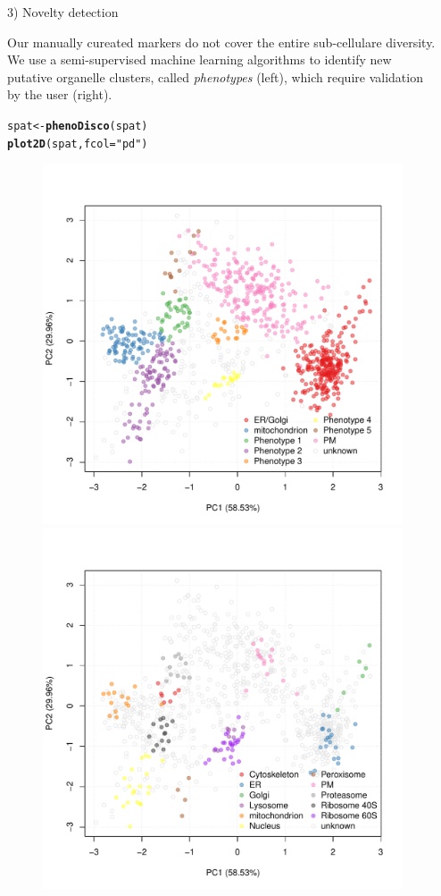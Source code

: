 \documentclass[final]{beamer}\usepackage[]{graphicx}\usepackage[]{color}
\makeatletter
\newcommand{\hlstr}[1]{\textcolor[rgb]{0.192,0.494,0.8}{#1}}%
\newcommand{\hlstd}[1]{\textcolor[rgb]{0.345,0.345,0.345}{#1}}%
\newcommand{\hlkwb}[1]{\textcolor[rgb]{0.69,0.353,0.396}{#1}}%
\newcommand{\hlkwc}[1]{\textcolor[rgb]{0.333,0.667,0.333}{#1}}%
\newcommand{\hlkwd}[1]{\textcolor[rgb]{0.737,0.353,0.396}{\textbf{#1}}}%
\newenvironment{kframe}{%
 \def\at@end@of@kframe{}%
 \ifinner\ifhmode%
  \def\at@end@of@kframe{\end{minipage}}%
  \begin{minipage}{\columnwidth}%
 \fi\fi%
 \def\FrameCommand##1{\hskip\@totalleftmargin \hskip-\fboxsep
 \colorbox{shadecolor}{##1}\hskip-\fboxsep
     \hskip-\linewidth \hskip-\@totalleftmargin \hskip\columnwidth}%
 \MakeFramed {\advance\hsize-\width
   \@totalleftmargin\z@ \linewidth\hsize
   \@setminipage}}%
 {\par\unskip\endMakeFramed%
 \at@end@of@kframe}
\newenvironment{knitrout}{}{} %
\makeatother
\begin{document}
\begin{frame}[fragile]
\begin{columns}
\begin{column}{.48\textwidth}
    \end{column}



    \begin{column}{.48\textwidth}  

      \begin{block}{3) Novelty detection}
        
        Our manually cureated markers do not cover the entire
        sub-cellulare diversity. We use a semi-supervised machine
        learning algorithms to identify new putative organelle
        clusters, called \emph{phenotypes} (left), which require
        validation by the user (right).

\begin{knitrout}
\color{fgcolor}\begin{kframe}
\begin{alltt}
\hlstd{spat} \hlkwb{<-} \hlkwd{phenoDisco}\hlstd{(spat)}
\hlkwd{plot2D}\hlstd{(spat,} \hlkwc{fcol} \hlstd{=} \hlstr{"pd"}\hlstd{)}
\end{alltt}
\end{kframe}
\end{knitrout}

      \begin{figure}
        \centering
        \includegraphics[width=.41\linewidth]{./figures/pca3.pdf}
        \includegraphics[width=.41\linewidth]{./figures/pca4.pdf}
      \end{figure}


\end{block}
\end{column}
\end{columns}
\end{frame}
\end{document}
